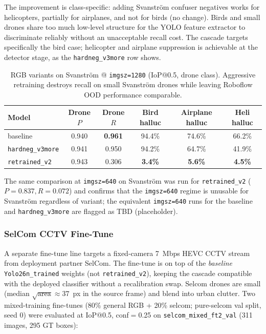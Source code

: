 The improvement is class-specific: adding Svanstr\"om confuser negatives works for helicopters, partially for airplanes, and not for birds (no change). Birds and small drones share too much low-level structure for the YOLO feature extractor to discriminate reliably without an unacceptable recall cost. The cascade targets specifically the bird case; helicopter and airplane suppression is achievable at the detector stage, as the \texttt{hardneg\_v3more} row shows.

\begin{table}[htbp]
    \centering
    \caption{RGB variants on Svanstr\"om @ \texttt{imgsz=1280} (IoP@0.5, drone class). Aggressive retraining destroys recall on small Svanstr\"om drones while leaving Roboflow OOD performance comparable.}
    \label{tab:rgb_comparison}
    \begin{tabular}{lccccc}
        \toprule
        Model & Drone $P$ & Drone $R$ & Bird halluc & Airplane halluc & Heli halluc \\
        \midrule
        baseline           & 0.940 & \textbf{0.961} & 94.4\% & 74.6\% & 66.2\% \\
        \texttt{hardneg\_v3more}  & 0.941 & 0.950 & 94.2\% & 64.7\% & 41.9\% \\
        \texttt{retrained\_v2}    & 0.943 & 0.306 & \textbf{3.4\%}  & \textbf{5.6\%}  & \textbf{4.5\%}  \\
        \bottomrule
    \end{tabular}
\end{table}

The same comparison at \texttt{imgsz=640} on Svanstr\"om was run for \texttt{retrained\_v2} ($P=0.837, R=0.072$) and confirms that the \texttt{imgsz=640} regime is unusable for Svanstr\"om regardless of variant; the equivalent \texttt{imgsz=640} runs for the baseline and \texttt{hardneg\_v3more} are flagged as TBD (placeholder).

\subsubsection{SelCom CCTV Fine-Tune}
\label{sec:selcom_finetune}

A separate fine-tune line targets a fixed-camera 7~Mbps HEVC CCTV stream from deployment partner SelCom. The fine-tune is on top of the \emph{baseline} \texttt{Yolo26n\_trained} weights (not \texttt{retrained\_v2}), keeping the cascade compatible with the deployed classifier without a recalibration swap. Selcom drones are small (median $\sqrt{\text{area}} \approx 37$~px in the source frame) and blend into urban clutter. Two mixed-training fine-tunes (80\% general RGB + 20\% selcom; pure-selcom val split, seed 0) were evaluated at IoP@0.5, conf$=$0.25 on \texttt{selcom\_mixed\_ft2\_val} (311 images, 295 GT boxes):

